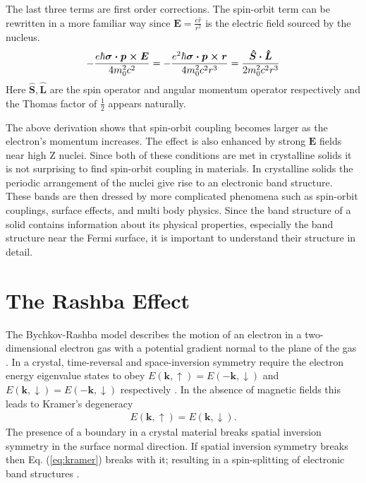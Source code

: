 \documentclass[12pt]{article}
\begin{document}
The last three terms are first order corrections.
The spin-orbit term can be rewritten in a more familiar way since $\boldsymbol{E}=\frac{e\hat{r}}{r^2}$ is the electric field sourced by the nucleus.
\begin{align}
  \label{eq:soc}
  -\frac{e\hbar\boldsymbol{\sigma\cdot p \times E}}{4m_0^2c^2}=-\frac{e^2\hbar\boldsymbol{\sigma\cdot p \times r}}{4m_0^2c^2r^3}\newline=\frac{\boldsymbol{\hat{S}\cdot \hat{L}}}{2m_0^2c^2r^3}
\end{align}
Here $\hat{\boldsymbol{S}}, \hat{\boldsymbol{L}}$ are the spin operator and angular momentum operator respectively and the Thomas factor of $\frac{1}{2}$ appears naturally.

The above derivation shows that spin-orbit coupling becomes larger as the electron's momentum increases.
The effect is also enhanced by strong $\boldsymbol{E}$ fields near high Z nuclei.
Since both of these conditions are met in crystalline solids it is not surprising to find spin-orbit coupling in materials.
In crystalline solids the periodic arrangement of the nuclei give rise to an electronic band structure.
These bands are then dressed by more complicated phenomena such as spin-orbit couplings, surface effects, and multi body physics.
Since the band structure of a solid contains information about its physical properties, especially the band structure near the Fermi surface, it is important to understand their structure in detail.

\section{The Rashba Effect}
The Bychkov-Rashba model describes the motion of an electron in a two-dimensional electron gas with a potential gradient normal to the plane of the gas \cite{Rashba}.
In a crystal, time-reversal and space-inversion symmetry require the electron energy eigenvalue states to obey $E(\boldsymbol{k},\uparrow)=E(-\boldsymbol{k},\downarrow)$ and $E(\boldsymbol{k},\downarrow)=E(-\boldsymbol{k},\downarrow)$ respectively \cite{Okuda-Kimura}.
In the absence of magnetic fields this leads to Kramer's degeneracy
\begin{align}
  \label{eq:kramer}
  E(\boldsymbol{k},\uparrow)=E(\boldsymbol{k},\downarrow)\text{.}
\end{align}
The presence of a boundary in a crystal material breaks spatial inversion symmetry in the surface normal direction.
If spatial inversion symmetry breaks then Eq. (\ref{eq:kramer}) breaks with it; resulting in a spin-splitting of electronic band structures \cite{Winkler}.
\end{document}
